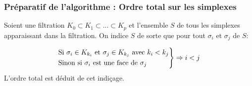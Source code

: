 \documentclass{beamer}
\begin{document}
\begin{frame}
    \frametitle{Préparatif de l'algorithme : Ordre total sur les simplexes}
    Soient une filtration $K_0 \subset K_1 \subset ... \subset K_p$ et l'ensemble $S$ de tous les simplexes apparaissant dans la filtration. On indice $S$ de sorte que pour tout $\sigma_i$ et $\sigma_j$ de $S$: 

    $$ 
    \begin{rcases}
        \text{Si } \sigma_i \in K_{k_i} \text{ et } \sigma_j \in K_{k_j} \text{ avec } k_i < k_j\\
        \text{Sinon si } \sigma_i \text{ est une face de } \sigma_j
    \end{rcases}\Rightarrow i < j 
    $$
    L'ordre total est déduit de cet indiçage.
\end{frame}
\end{document}
